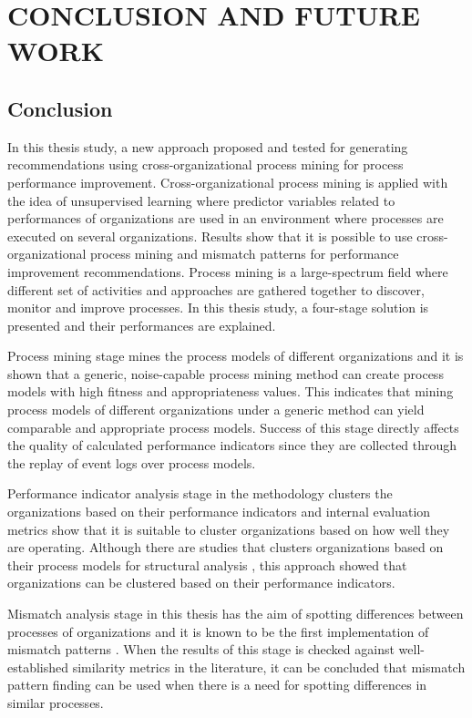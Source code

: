 \chapter{CONCLUSION AND FUTURE WORK}
\label{chp:conclusion-and-future-work}

\section{Conclusion}

In this thesis study, a new approach proposed and tested for generating recommendations using cross-organizational process mining for process performance improvement. Cross-organizational process mining is applied with the idea of unsupervised learning where predictor variables related to performances of organizations are used in an environment where processes are executed on several organizations. Results show that it is possible to use cross-organizational process mining and mismatch patterns for performance improvement recommendations. Process mining is a large-spectrum field where different set of activities and approaches are gathered together to discover, monitor and improve processes. In this thesis study, a four-stage solution is presented and their performances are explained.

Process mining stage mines the process models of different organizations and it is shown that a generic, noise-capable process mining method can create process models with high fitness and appropriateness values. This indicates that mining process models of different organizations under a generic method can yield comparable and appropriate process models. Success of this stage directly affects the quality of calculated performance indicators since they are collected through the replay of event logs over process models.

Performance indicator analysis stage in the methodology clusters the organizations based on their performance indicators and internal evaluation metrics show that it is suitable to cluster organizations based on how well they are operating. Although there are studies that clusters organizations based on their process models for structural analysis \cite{greco2005mining}, this approach showed that organizations can be clustered based on their performance indicators.

Mismatch analysis stage in this thesis has the aim of spotting differences between processes of organizations and it is known to be the first implementation of mismatch patterns \cite{dijkman2007mismatch}. When the results of this stage is checked against well-established similarity metrics in the literature, it can be concluded that mismatch pattern finding can be used when there is a need for spotting differences in similar processes. 

